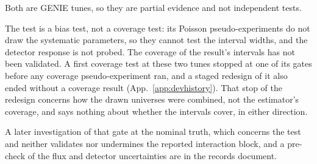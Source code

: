 Both are GENIE tunes, so they are partial evidence and not independent tests.

The test is a bias test, not a coverage test: its Poisson pseudo-experiments do not draw the systematic parameters, so they cannot test the interval widths, and the detector response is not probed. The coverage of the result's intervals has not been validated. A first coverage test at these two tunes stopped at one of its gates before any coverage pseudo-experiment ran, and a staged redesign of it also ended without a coverage result (App.~\ref{app:devhistory}). That stop of the redesign concerns how the drawn universes were combined, not the estimator's coverage, and says nothing about whether the intervals cover, in either direction.

A later investigation of that gate at the nominal truth, which concerns the test and neither validates nor undermines the reported interaction block, and a pre-check of the flux and detector uncertainties are in the records document.
